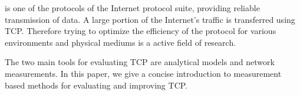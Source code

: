 
 is one of the protocols of the Internet protocol suite, providing reliable transmission of data. A large portion of the Internet's traffic is transferred using TCP. Therefore trying to optimize the efficiency of the protocol for various environments and physical mediums is a active field of research.

The two main tools for evaluating TCP are analytical models and network measurements. In this paper, we give a concise introduction to measurement based methods for evaluating and improving TCP.



